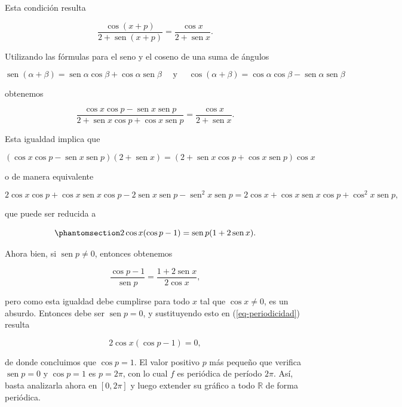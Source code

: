 \documentclass[
  letterpaper,
]{book}
\theoremstyle{plain}
\theoremstyle{remark}
\begin{document}
\begin{tcolorbox}
Esta condición resulta

\[
\frac{\cos(x+p)}{2+\operatorname{sen}(x+p)}=\frac{\cos x}{2+\operatorname{sen} x}.
\]

Utilizando las fórmulas para el seno y el coseno de una suma de ángulos

\[
\operatorname{sen}(\alpha+\beta)=\operatorname{sen} \alpha \cos \beta +\cos\alpha \operatorname{sen} \beta \quad \text{ y } \quad \cos(\alpha+\beta)=\cos\alpha\cos\beta-\operatorname{sen} \alpha\operatorname{sen} \beta
\]

obtenemos

\[
\frac{\cos x\cos p-\operatorname{sen} x\operatorname{sen} p}{2+\operatorname{sen} x\cos p+\cos x\operatorname{sen} p}=\frac{\cos x}{2+\operatorname{sen} x}.
\]

Esta igualdad implica que

\[
(\cos x\cos p-\operatorname{sen} x\operatorname{sen} p)(2+\operatorname{sen} x)=(2+\operatorname{sen} x\cos p+\cos x\operatorname{sen} p)\cos x
\]

o de manera equivalente

\[
2\cos x\cos p+\cos x\operatorname{sen} x\cos p-2\operatorname{sen} x\operatorname{sen} p-\operatorname{sen}^2 x\operatorname{sen} p=2\cos x+\cos x\operatorname{sen} x\cos p+\cos^2x\operatorname{sen} p,
\]

que puede ser reducida a

\begin{equation}\phantomsection\label{eq-periodicidad}{
2\cos x(\cos p-1)=\operatorname{sen} p(1+2\operatorname{sen} x).
}\end{equation}

Ahora bien, si \(\operatorname{sen} p\neq 0\), entonces obtenemos

\[
\frac{\cos p-1}{\operatorname{sen} p}=\frac{1+2\operatorname{sen} x}{2\cos x},
\]

pero como esta igualdad debe cumplirse para todo \(x\) tal que
\(\cos x\neq 0\), es un absurdo. Entonces debe ser
\(\operatorname{sen} p=0\), y sustituyendo esto en
(\ref{eq-periodicidad}) resulta

\[
2\cos x(\cos p-1)=0,
\]

de donde concluimos que \(\cos p=1\). El valor positivo \(p\) más
pequeño que verifica \(\operatorname{sen} p=0\) y \(\cos p=1\) es
\(p=2\pi\), con lo cual \(f\) es periódica de período \(2\pi\). Así,
basta analizarla ahora en \([0,2\pi]\) y luego extender su gráfico a
todo \(\mathbb{R}\) de forma periódica.


\end{tcolorbox}
\end{document}
